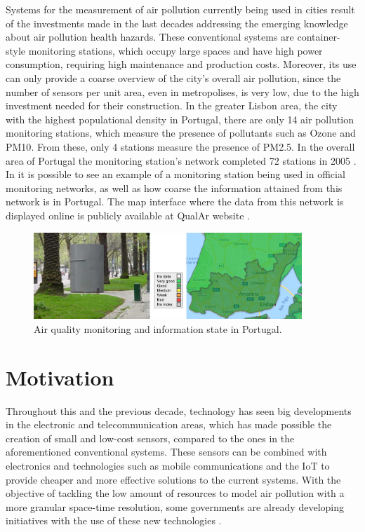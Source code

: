 Systems for the measurement of air pollution currently being used in cities result of the investments made in the last decades addressing the emerging knowledge about air pollution health hazards. These conventional systems are container-style monitoring stations, which occupy large spaces and have high power consumption, requiring high maintenance and production costs. Moreover, its use can only provide a coarse overview of the city’s overall air pollution, since the number of sensors per unit area, even in metropolises, is very low, due to the high investment needed for their construction. In the greater Lisbon area, the city with the highest populational density in Portugal, there are only 14 air pollution monitoring stations, which measure the presence of pollutants such as Ozone and \ac{PM10}. From these, only 4 stations measure the presence of PM2.5. In the overall area of Portugal the monitoring station’s network completed 72 stations in 2005 \cite{APA2008}. In  it is possible to see an example of a monitoring station being used in official monitoring networks, as well as how coarse the information attained from this network is in Portugal. The map interface where the data from this network is displayed online is publicly available at \ac{QualAr} website \cite{AgenciaPortuguesadoAmbiente2011}.


\begin{figure}[ht]
\centering
\includegraphics[width=0.9\textwidth]{./Images/ieec1.png}
\caption{Air quality monitoring and information state in Portugal.}
\label{fig:ieec1}
\end{figure}

\section{Motivation}


Throughout this and the previous decade, technology has seen big developments in the electronic and telecommunication areas, which has made possible the creation of small and low-cost sensors, compared to the ones in the aforementioned conventional systems. These sensors can be combined with electronics and technologies such as mobile communications and the \ac{IoT} to provide cheaper and more effective solutions to the current systems. With the objective of tackling the low amount of resources to model air pollution with a more granular space-time resolution, some governments are already developing initiatives with the use of these new technologies \cite{GSMA2018}.

